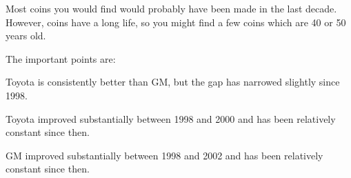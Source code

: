 \documentclass{exam}
\begin{document}
\begin{description}

      \item[39]

      \item[40]
        Most coins you would find would probably have been made in the last decade.  However, coins have a long life, so
        you might find a few coins which are 40 or 50 years old.

      \item[41]
        The important points are:
        \begin{itemize*}
          \item Toyota is consistently better than GM, but the gap has narrowed slightly since 1998.
          \item Toyota improved substantially between 1998 and 2000 and has been relatively constant since then.
          \item GM improved substantially between 1998 and 2002 and has been relatively constant since then.
        \end{itemize*}


\end{description}
\end{document}
